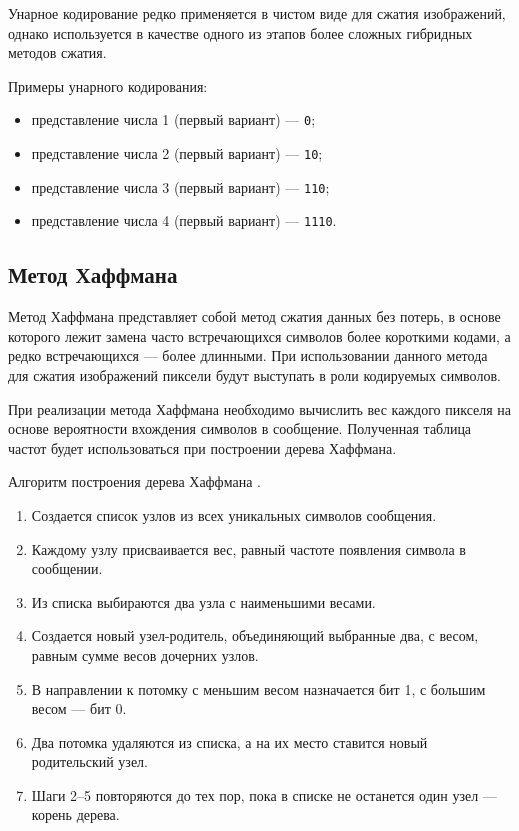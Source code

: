 Унарное кодирование редко применяется в чистом виде для сжатия изображений, однако используется в качестве одного из этапов более сложных гибридных методов сжатия.

Примеры унарного кодирования:
\begin{itemize}
    \item представление числа 1 (первый вариант) --- \texttt{0};
    \item представление числа 2 (первый вариант) --- \texttt{10};
    \item представление числа 3 (первый вариант) --- \texttt{110};
    \item представление числа 4 (первый вариант) --- \texttt{1110}.
\end{itemize}

\subsection{Метод Хаффмана}

Метод Хаффмана \cite{Huffman} представляет собой метод сжатия данных без потерь, в основе которого лежит замена часто встречающихся символов более короткими кодами, а редко встречающихся --- более длинными. При использовании данного метода для сжатия изображений пиксели будут выступать в роли кодируемых символов.  

При реализации метода Хаффмана необходимо вычислить вес каждого пикселя на основе вероятности вхождения символов в сообщение. Полученная таблица частот будет использоваться при построении дерева Хаффмана.

Алгоритм построения дерева Хаффмана \cite{article-huffman}.
\begin{enumerate}
    \item Создается список узлов из всех уникальных символов сообщения.
    \item Каждому узлу присваивается вес, равный частоте появления символа в сообщении.
    \item Из списка выбираются два узла с наименьшими весами.
    \item Создается новый узел-родитель, объединяющий выбранные два, с весом, равным сумме весов дочерних узлов.
    \item В направлении к потомку с меньшим весом назначается бит 1, с большим весом --- бит 0.
    \item Два потомка удаляются из списка, а на их место ставится новый родительский узел.
    \item Шаги 2--5 повторяются до тех пор, пока в списке не останется один узел --- корень дерева.
\end{enumerate}

